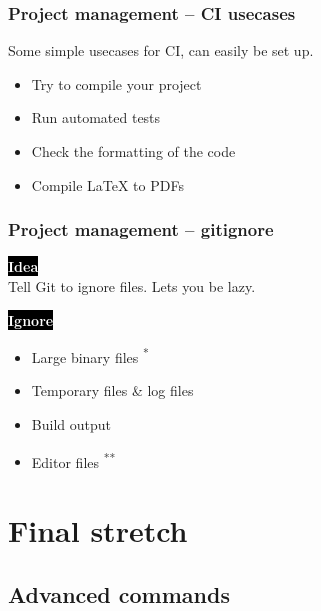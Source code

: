 \documentclass{beamer}
\newcommand{\keyword}[1]{\hspace{-1.0em}\colorbox{black}{\textcolor{white}{\textbf{#1}\vphantom{Ep}}}\vspace{0.2em}} %
\begin{document}
\begin{frame}[fragile]
  \frametitle{Project management -- CI usecases} %

  Some simple usecases for CI, can easily be set up.
  \vspace{1em}
  \begin{itemize}
    \item Try to compile your project
    \item Run automated tests
    \item Check the formatting of the code
    \item Compile \LaTeX{} to PDFs
  \end{itemize}

\end{frame}

\begin{frame}[fragile]
  \frametitle{Project management -- gitignore}

  \keyword{Idea} \\
  Tell Git to ignore files. Lets you be lazy.
  \vspace{1em}

  \keyword{Ignore}
  \begin{itemize}
    \item<2-> Large binary files \textsuperscript{*}
    \item<3-> Temporary files \& log files
    \item<4-> Build output
    \item<5-> Editor files \textsuperscript{**}
  \end{itemize}
  \vspace{1em}

  \vspace{1em}

\end{frame}

\section{Final stretch}
\subsection{Advanced commands}
\end{document}
